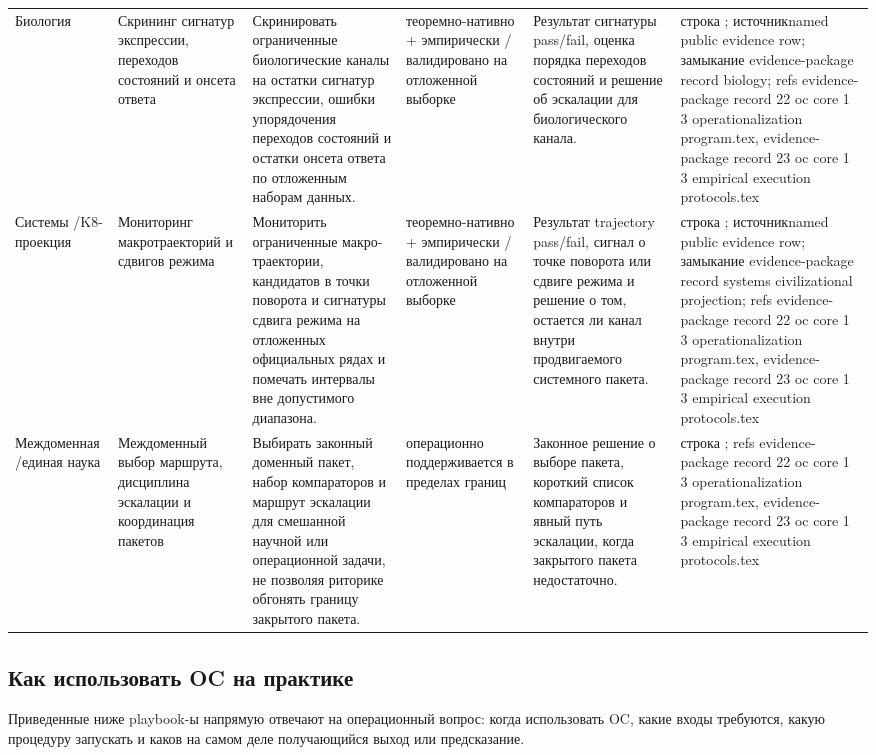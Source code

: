 \begin{longtable}{@{}L{0.11\textwidth}L{0.16\textwidth}L{0.19\textwidth}L{0.12\textwidth}L{0.18\textwidth}L{0.16\textwidth}@{}}
Биология & Скрининг сигнатур экспрессии, переходов состояний и онсета ответа & Скринировать ограниченные биологические каналы на остатки сигнатур экспрессии, ошибки упорядочения переходов состояний и остатки онсета ответа по отложенным наборам данных. & теоремно-нативно + эмпирически / валидировано на отложенной выборке & Результат сигнатуры pass/fail, оценка порядка переходов состояний и решение об эскалации для биологического канала. & строка ; \allowbreak источникnamed public evidence row; \allowbreak замыкание evidence-package record biology; \allowbreak refs evidence-package record 22 oc core 1 3 operationalization program.tex, \allowbreak evidence-package record 23 oc core 1 3 empirical execution protocols.tex \\
Системы /\allowbreak K8-проекция & Мониторинг макротраекторий и сдвигов режима & Мониторить ограниченные макро-траектории, кандидатов в точки поворота и сигнатуры сдвига режима на отложенных официальных рядах и помечать интервалы вне допустимого диапазона. & теоремно-нативно + эмпирически / валидировано на отложенной выборке & Результат trajectory pass/fail, сигнал о точке поворота или сдвиге режима и решение о том, остается ли канал внутри продвигаемого системного пакета. & строка ; \allowbreak источникnamed public evidence row; \allowbreak замыкание evidence-package record systems civilizational projection; \allowbreak refs evidence-package record 22 oc core 1 3 operationalization program.tex, \allowbreak evidence-package record 23 oc core 1 3 empirical execution protocols.tex \\
Междоменная /\allowbreak единая наука & Междоменный выбор маршрута, дисциплина эскалации и координация пакетов & Выбирать законный доменный пакет, набор компараторов и маршрут эскалации для смешанной научной или операционной задачи, не позволяя риторике обгонять границу закрытого пакета. & операционно поддерживается в пределах границ & Законное решение о выборе пакета, короткий список компараторов и явный путь эскалации, когда закрытого пакета недостаточно. & строка ; \allowbreak refs evidence-package record 22 oc core 1 3 operationalization program.tex, \allowbreak evidence-package record 23 oc core 1 3 empirical execution protocols.tex \\
\bottomrule
\end{longtable}
\endgroup

\subsection{Как использовать OC на практике}
Приведенные ниже playbook-ы напрямую отвечают на операционный вопрос: когда использовать OC, какие входы требуются, какую процедуру запускать и каков на самом деле получающийся выход или предсказание.

